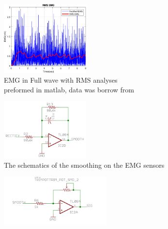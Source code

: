 \begin{multicols}{2}
\begin{figure}[H]
    \centering
    \includegraphics[width=0.4\textwidth]{Figures/EMG/epsFigRMS}
    \caption{EMG in Full wave with RMS analyses\\ preformed in matlab, data was borrow from\cite{EMGDATA}}
    \label{ref:Wasmooth}
\end{figure}
\columnbreak
\begin{figure}[H]
    \centering
    \includegraphics[width=0.4\textwidth]{Figures/EMG/Smooth.PNG}
    \caption{The schematics of the smoothing on the EMG sensors\cite{SparkfunScematicEMG}}
    \label{fig:smooth}
\end{figure} 
\end{multicols}




\begin{figure}[H]
    \centering
    \includegraphics[width=0.5\textwidth]{Figures/EMG/FinalGain.PNG}
    \caption{}
    \label{fig:finalGain}
\end{figure} 


